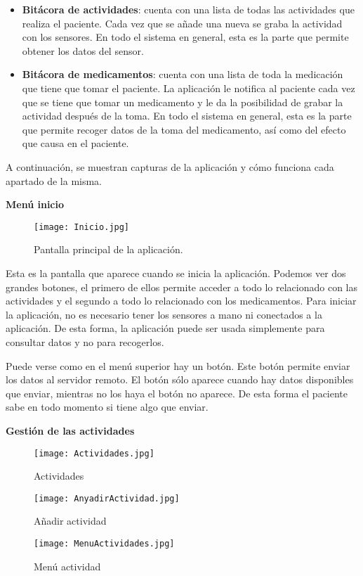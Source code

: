 \documentclass[11pt,spanish]{article}
\begin{document}
\begin{itemize}
	\item {\bf Bitácora de actividades}: cuenta con una lista de todas las actividades que realiza el paciente. Cada vez que se añade una nueva se graba la actividad con los sensores. En todo el sistema en general, esta es la parte que permite obtener los datos del sensor.
    \item {\bf Bitácora de medicamentos}: cuenta con una lista de toda la medicación que tiene que tomar el paciente. La aplicación le notifica al paciente cada vez que se tiene que tomar un medicamento y le da la posibilidad de grabar la actividad después de la toma. En todo el sistema en general, esta es la parte que permite recoger datos de la toma del medicamento, así como del efecto que causa en el paciente.
\end{itemize}

A continuación, se muestran capturas de la aplicación y cómo funciona cada apartado de la misma.
\newline

{\bf Menú inicio}
\begin{figure}[h!]
\centering
\texttt{[image: Inicio.jpg]}
\caption{Pantalla principal de la aplicación.}
\end{figure}
\newpage

Esta es la pantalla que aparece cuando se inicia la aplicación. Podemos ver dos grandes botones, el primero de ellos permite acceder a todo lo relacionado con las actividades y el segundo a todo lo relacionado con los medicamentos. Para iniciar la aplicación, no es necesario tener los sensores a mano ni conectados a la aplicación. De esta forma, la aplicación puede ser usada simplemente para consultar datos y no para recogerlos.
\newline

Puede verse como en el menú superior hay un botón. Este botón permite enviar los datos al servidor remoto. El botón sólo aparece cuando hay datos disponibles que enviar, mientras no los haya el botón no aparece. De esta forma el paciente sabe en todo momento si tiene algo que enviar.
\newline

{\bf Gestión de las actividades}
\newline
\begin{figure}[!htb]
  \texttt{[image: Actividades.jpg]}
  \caption{Actividades}
  \label{Actividades}
\endminipage\hfill
{}
  \texttt{[image: AnyadirActividad.jpg]}
  \caption{Añadir actividad}
  \label{Añadir actividad}
\endminipage\hfill
{}%
  \texttt{[image: MenuActividades.jpg]}
  \caption{Menú actividad}
  \label{Menú actividad}
\endminipage
\end{figure}
\end{document}
